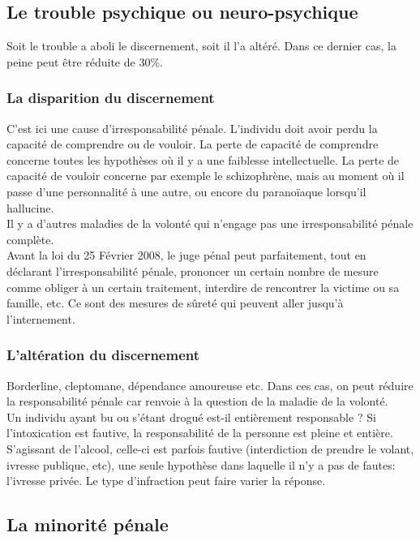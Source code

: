 \documentclass[10pt, a4paper, openany]{book}
\begin{document}
\subsection{Le trouble psychique ou neuro-psychique}

Soit le trouble a aboli le discernement, soit il l'a altéré. Dans ce dernier cas, la peine peut être réduite de 30\%. 

\subsubsection{La disparition du discernement}

C'est ici une cause d'irresponsabilité pénale. L'individu doit avoir perdu la capacité de comprendre ou de vouloir. La perte de capacité de comprendre concerne toutes les hypothèses où il y a une faiblesse intellectuelle. La perte de capacité de vouloir concerne par exemple le schizophrène, mais au moment où il passe d'une personnalité à une autre, ou encore du paranoïaque lorsqu'il hallucine. \\
Il y a d'autres maladies de la volonté qui n'engage pas une irresponsabilité pénale complète. \\
Avant la loi du 25 Février 2008, le juge pénal peut parfaitement, tout en déclarant l'irresponsabilité pénale, prononcer un certain nombre de mesure comme obliger à un certain traitement, interdire de rencontrer la victime ou sa famille, etc. Ce sont des mesures de sûreté qui peuvent aller jusqu'à l'internement. 

\subsubsection{L'altération du discernement}

Borderline, cleptomane, dépendance amoureuse etc. Dans ces cas, on peut réduire la responsabilité pénale car renvoie à la question de la maladie de la volonté. \\
Un individu ayant bu ou s'étant drogué est-il entièrement responsable ?  Si l'intoxication est fautive, la responsabilité de la personne est pleine et entière. S'agissant de l'alcool, celle-ci est parfois fautive (interdiction de prendre le volant, ivresse publique, etc), une seule hypothèse dans laquelle il n'y a pas de fautes: l'ivresse privée. Le type d'infraction peut faire varier la réponse. 


\subsection{La minorité pénale}
\end{document}
